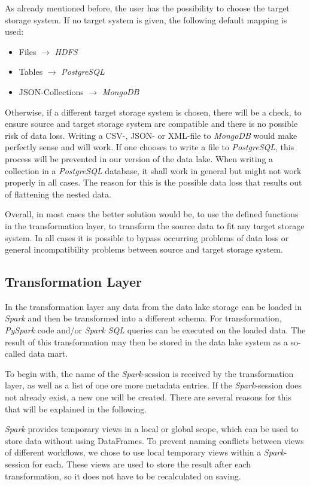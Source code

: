 \documentclass[conference]{IEEEtran}
\begin{document}
As already mentioned before, the user has the possibility to choose the target storage system. 
If no target system is given, the following default mapping is used:

\begin{itemize}
\item[] Files $\to$ \textit{HDFS}
\item[] Tables $\to$ \textit{PostgreSQL}
\item[] JSON-Collections $\to$ \textit{MongoDB}
\end{itemize}

Otherwise, if a different target storage system is chosen, there will be a check, to ensure source 
and target storage system are compatible and there is no possible risk of data loss. 
Writing a CSV-, JSON- or XML-file to \textit{MongoDB} would make perfectly sense and will work. 
If one chooses to write a file to \textit{PostgreSQL}, this process will be prevented in our version of the
data lake.
When writing a collection in a \textit{PostgreSQL} database, it shall work in general but might not work 
properly in all cases. 
The reason for this is the possible data loss that results out of flattening the nested data. 

Overall, in most cases the better solution would be, to use the defined functions in the
transformation layer, to transform the source data to fit any target storage system. 
In all cases it is possible to bypass occurring problems of data loss or general 
incompatibility problems between source and target storage system. 

\subsection{Transformation Layer}\label{TFL}
In the transformation layer any data from the data lake storage can be loaded in \textit{Spark} and 
then be transformed into a different schema.
For transformation, \textit{PySpark} code and/or \textit{Spark SQL} queries can be executed on the 
loaded data.
The result of this transformation may then be stored in the data lake system as a so-called data 
mart.

To begin with, the name of the \textit{Spark}-session is received by the transformation layer, as 
well as a list of one ore more metadata entries.
If the \textit{Spark}-session does not already exist, a new one will be created.
There are several reasons for this that will be explained in the following.

\textit{Spark} provides temporary views in a local or global scope, which can be used to store data
without using DataFrames.
To prevent naming conflicts between views of different workflows, we chose to use local 
temporary views within a \textit{Spark}-session for each.
These views are used to store the result after each transformation, so it does not have to be 
recalculated on saving.
\end{document}
